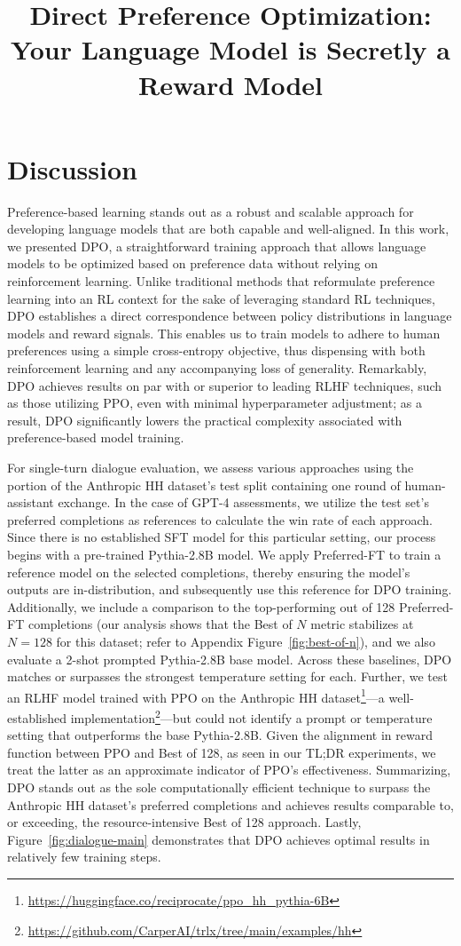 \title{Direct Preference Optimization: Your Language Model is Secretly a Reward Model}
\section{Discussion}
Preference-based learning stands out as a robust and scalable approach for developing language models that are both capable and well-aligned. In this work, we presented DPO, a straightforward training approach that allows language models to be optimized based on preference data without relying on reinforcement learning. Unlike traditional methods that reformulate preference learning into an RL context for the sake of leveraging standard RL techniques, DPO establishes a direct correspondence between policy distributions in language models and reward signals. This enables us to train models to adhere to human preferences using a simple cross-entropy objective, thus dispensing with both reinforcement learning and any accompanying loss of generality. Remarkably, DPO achieves results on par with or superior to leading RLHF techniques, such as those utilizing PPO, even with minimal hyperparameter adjustment; as a result, DPO significantly lowers the practical complexity associated with preference-based model training.

For single-turn dialogue evaluation, we assess various approaches using the portion of the Anthropic HH dataset’s test split \citep{bai2022training} containing one round of human-assistant exchange. In the case of GPT-4 assessments, we utilize the test set’s preferred completions as references to calculate the win rate of each approach. Since there is no established SFT model for this particular setting, our process begins with a pre-trained Pythia-2.8B model. We apply Preferred-FT to train a reference model on the selected completions, thereby ensuring the model’s outputs are in-distribution, and subsequently use this reference for DPO training. Additionally, we include a comparison to the top-performing out of 128 Preferred-FT completions (our analysis shows that the Best of $N$ metric stabilizes at $N=128$ for this dataset; refer to Appendix Figure~\ref{fig:best-of-n}), and we also evaluate a 2-shot prompted Pythia-2.8B base model. Across these baselines, DPO matches or surpasses the strongest temperature setting for each. Further, we test an RLHF model trained with PPO on the Anthropic HH dataset\footnote{\url{https://huggingface.co/reciprocate/ppo_hh_pythia-6B}}—a well-established implementation\footnote{\url{https://github.com/CarperAI/trlx/tree/main/examples/hh}}—but could not identify a prompt or temperature setting that outperforms the base Pythia-2.8B. Given the alignment in reward function between PPO and Best of 128, as seen in our TL;DR experiments, we treat the latter as an approximate indicator of PPO's effectiveness. Summarizing, DPO stands out as the sole computationally efficient technique to surpass the Anthropic HH dataset’s preferred completions and achieves results comparable to, or exceeding, the resource-intensive Best of 128 approach. Lastly, Figure~\ref{fig:dialogue-main} demonstrates that DPO achieves optimal results in relatively few training steps.

